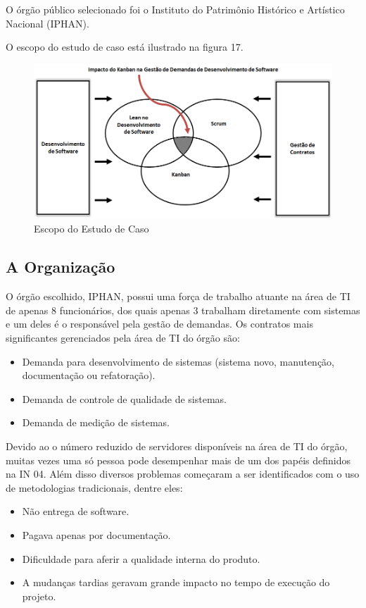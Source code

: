 O órgão público selecionado foi o Instituto do Patrimônio Histórico e Artístico Nacional (IPHAN).

O escopo do estudo de caso está ilustrado na figura 17. 
\begin{figure}[H]
		\centering
		\label{fig01}
			\includegraphics[scale=0.6]{figuras/escopoEC.png}
		\caption{Escopo do Estudo de Caso}
\end{figure}

\subsection[A Organização]{A Organização}

O órgão escolhido, IPHAN, possui uma força de trabalho atuante na área de TI de apenas 8 funcionários, dos quais apenas 3 trabalham diretamente com sistemas e um deles é o responsável pela gestão de demandas. Os contratos mais significantes gerenciados pela área de TI do órgão são:
\begin{itemize}
\item Demanda para desenvolvimento de sistemas (sistema novo, manutenção, documentação ou refatoração).
\item Demanda de controle de qualidade de sistemas.
\item Demanda de medição de sistemas.
\end{itemize}

Devido ao o número reduzido de servidores disponíveis na área de TI do órgão, muitas vezes uma só pessoa pode desempenhar mais de um dos papéis definidos na IN 04. Além disso diversos problemas começaram a ser identificados com o uso de metodologias tradicionais, dentre eles:
\begin{itemize}
\item Não entrega de software.
\item Pagava apenas por documentação.
\item Dificuldade para aferir a qualidade interna do produto.
\item A mudanças tardias geravam grande impacto no tempo de execução do projeto.
\end{itemize}

